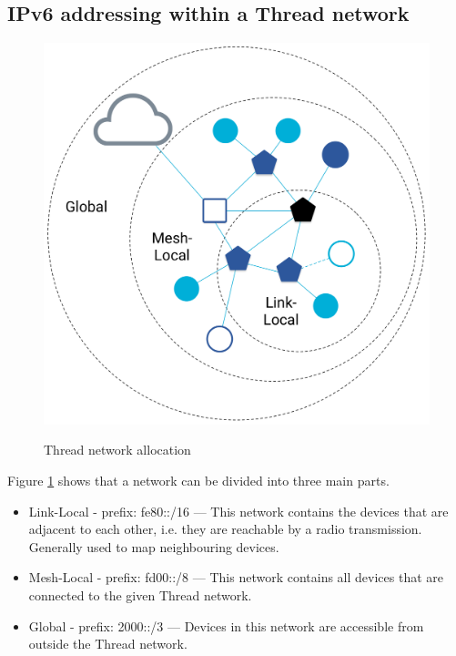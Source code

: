 \subsection{IPv6 addressing within a Thread network}
\begin{figure}
    \centering
    \includegraphics[scale=0.16]{img/ot-primer-scopes.png}
    \caption{Thread network allocation}
    \label{fig:thread_scope}
    \cite{thread_scope}
\end{figure}

Figure \ref{fig:thread_scope} shows that a network can be divided into three main parts.\cite{ThreadIPv6}
\begin{itemize}
    \item Link-Local - prefix: fe80::/16 --- This network contains the devices that are adjacent to each other, i.e. they are reachable by a radio transmission. Generally used to map neighbouring devices.
    \item Mesh-Local - prefix: fd00::/8 --- This network contains all devices that are connected to the given Thread network.
    \item Global - prefix: 2000::/3 --- Devices in this network are accessible from outside the Thread network.
\end{itemize}


